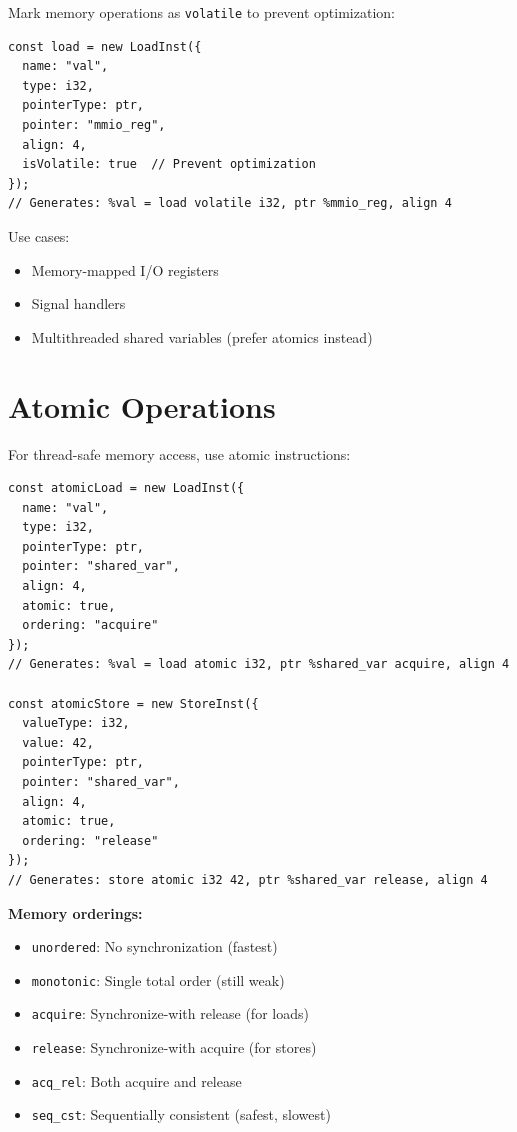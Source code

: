 \documentclass[11pt,oneside]{book}
\begin{document}
Mark memory operations as \texttt{volatile} to prevent optimization:

\begin{lstlisting}[style=ts]
const load = new LoadInst({
  name: "val",
  type: i32,
  pointerType: ptr,
  pointer: "mmio_reg",
  align: 4,
  isVolatile: true  // Prevent optimization
});
// Generates: %val = load volatile i32, ptr %mmio_reg, align 4
\end{lstlisting}

Use cases:
\begin{itemize}[noitemsep]
  \item Memory-mapped I/O registers
  \item Signal handlers
  \item Multithreaded shared variables (prefer atomics instead)
\end{itemize}

\section{Atomic Operations}

For thread-safe memory access, use atomic instructions:

\begin{lstlisting}[style=ts]
const atomicLoad = new LoadInst({
  name: "val",
  type: i32,
  pointerType: ptr,
  pointer: "shared_var",
  align: 4,
  atomic: true,
  ordering: "acquire"
});
// Generates: %val = load atomic i32, ptr %shared_var acquire, align 4

const atomicStore = new StoreInst({
  valueType: i32,
  value: 42,
  pointerType: ptr,
  pointer: "shared_var",
  align: 4,
  atomic: true,
  ordering: "release"
});
// Generates: store atomic i32 42, ptr %shared_var release, align 4
\end{lstlisting}

\textbf{Memory orderings:}
\begin{itemize}[noitemsep]
  \item \texttt{unordered}: No synchronization (fastest)
  \item \texttt{monotonic}: Single total order (still weak)
  \item \texttt{acquire}: Synchronize-with release (for loads)
  \item \texttt{release}: Synchronize-with acquire (for stores)
  \item \texttt{acq\_rel}: Both acquire and release
  \item \texttt{seq\_cst}: Sequentially consistent (safest, slowest)
\end{itemize}
\end{document}
